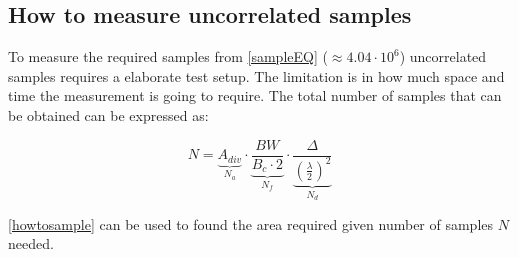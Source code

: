 \subsection{How to measure uncorrelated samples}
\label{howtomeasureUS}
To measure the required samples from \autoref{sampleEQ} ($\approx 4.04\cdot10^6$) uncorrelated samples requires a elaborate test setup. The limitation is in how much space and time the measurement is going to require. The total number of samples that can be obtained can be expressed as: 

\begin{equation}
N = \underbrace{A_{div}}_\text{$N_a$} \cdot \underbrace{\frac{BW}{B_c \cdot 2}}_\text{$N_f$} \cdot \underbrace{\frac{\Delta}{(\frac{\lambda}{2})^2}}_\text{$N_d$}
\label{howtosample}
\end{equation} 
 
\begin{where}
\end{where} 
 

\autoref{howtosample} can be used to found the area required given number of samples $N$ needed.

